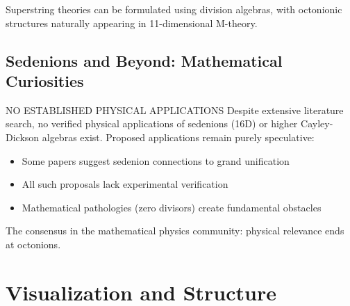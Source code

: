 \begin{theorem}
Superstring theories can be formulated using division algebras, with octonionic structures naturally appearing in 11-dimensional M-theory.
\end{theorem}

\subsection{Sedenions and Beyond: Mathematical Curiosities}

\begin{factcheck}{NO ESTABLISHED PHYSICAL APPLICATIONS}
Despite extensive literature search, no verified physical applications of sedenions (16D) or higher Cayley-Dickson algebras exist. Proposed applications remain purely speculative:
\begin{itemize}
    \item[$?$] Some papers suggest sedenion connections to grand unification \cite{chanyal2015sedenion}
    \item[$?$] All such proposals lack experimental verification
    \item[$?$] Mathematical pathologies (zero divisors) create fundamental obstacles
\end{itemize}

The consensus in the mathematical physics community: physical relevance ends at octonions.
\end{factcheck}

\section{Visualization and Structure}

